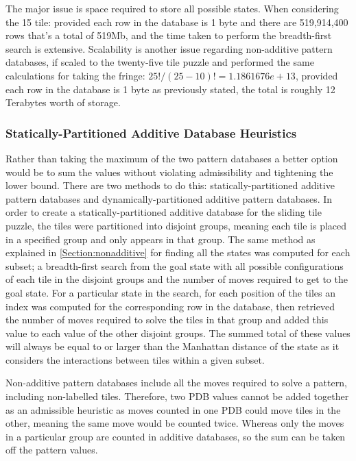 \documentclass[final]{cmpreport}
\begin{document}
The major issue is space required to store all possible states. When considering the 15 tile: provided each row in the database is 1 byte and there are 519,914,400 rows that's a total of 519Mb, and the time taken to perform the breadth-first search is extensive. Scalability is another issue regarding non-additive pattern databases, if scaled to the twenty-five tile puzzle and performed the same calculations for taking the fringe: $25!/(25-10)!=1.1861676e+13$, provided each row in the database is 1 byte as previously stated, the total is roughly 12 Terabytes worth of storage.







\subsubsection{Statically-Partitioned Additive Database Heuristics}
Rather than taking the maximum of the two pattern databases a better option would be to sum the values without violating admissibility and tightening the lower bound. There are two methods to do this: statically-partitioned additive pattern databases and dynamically-partitioned additive pattern databases. In order to create a statically-partitioned additive database for the sliding tile puzzle, the tiles were partitioned into disjoint groups, meaning each tile is placed in a specified group and only appears in that group. The same method as explained in \ref{Section:nonadditive} for finding all the states was computed for each subset; a breadth-first search from the goal state with all possible configurations of each tile in the disjoint groups and the number of moves required to get to the goal state. For a particular state in the search, for each position of the tiles an index was computed for the corresponding row in the database, then retrieved the number of moves required to solve the tiles in that group and added this value to each value of the other disjoint groups. The summed total of these values will always be equal to or larger than the Manhattan distance of the state as it considers the interactions between tiles within a given subset.	

Non-additive pattern databases include all the moves required to solve a pattern, including non-labelled tiles. Therefore, two PDB values cannot be added together as an admissible heuristic as moves counted in one PDB could move tiles in the other, meaning the same move would be counted twice. Whereas only the moves in a particular group are counted in additive databases, so the sum can be taken off the pattern values.
\end{document}
